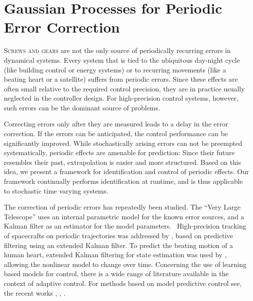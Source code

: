 \chapter{Gaussian Processes for Periodic Error Correction}
\label{ch:periodic-error-correction}

\lettrine{S}{crews and gears} are not the only source of periodically
recurring errors in dynamical systems. Every system that is tied to the
ubiquitous day-night cycle (like building control or energy systems) or to
recurring movements (like a beating heart or a satellite) suffers from
periodic errors. Since these effects are often small relative to the
required control precision, they are in practice usually neglected in the
controller design. For high-precision control systems, however, such errors can
be the dominant source of problems.

Correcting errors only after they are measured leads to a delay in the error
correction. If the errors can be anticipated, the control performance can be
significantly improved. While stochastically arising errors can not be
preempted systematically, periodic effects are amenable for prediction: Since
their future resembles their past, extrapolation is easier and more structured.
Based on this idea, we present a framework for identification and control of
periodic effects. Our framework continually performs identification at runtime,
%
%
%
%
%
%
%
%
%
%
and is thus applicable to stochastic time varying systems.

The correction of periodic errors has repeatedly been studied. The ``Very Large
Telescope'' uses an internal parametric model for the known error sources, and
a Kalman filter 
as an estimator for the model
parameters.~ High-precision tracking of
spacecrafts on periodic trajectories was addressed by
\citeauthor{Crassidis.Markley:1997:Predictive}
, based on predictive filtering using
an extended Kalman filter. To predict the beating motion of a human heart,
extended Kalman filtering for state estimation was used by
\citeauthor{Yuen.Novotny.ea:2008:Quasiperiodic}
, allowing the nonlinear model to
change over time. Concerning the use of learning based models for control, there
is a wide range of literature available in the context of adaptive control. For
methods based on model predictive control see, \eg the recent works
,
,
.

